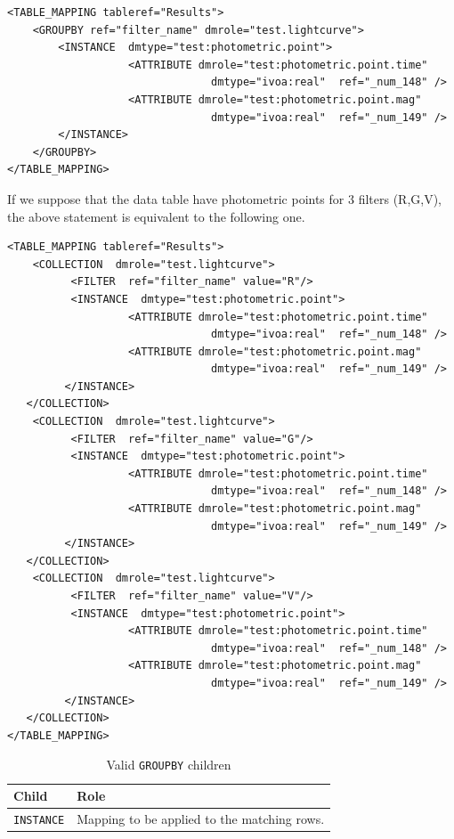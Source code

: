 \documentclass[11pt,a4paper]{ivoa}
\begin{document}
\begin{lstlisting}[caption={GROUPBY examples},style=XML]
<TABLE_MAPPING tableref="Results">
    <GROUPBY ref="filter_name" dmrole="test.lightcurve">
        <INSTANCE  dmtype="test:photometric.point">
                   <ATTRIBUTE dmrole="test:photometric.point.time" 
                                dmtype="ivoa:real"  ref="_num_148" />
                   <ATTRIBUTE dmrole="test:photometric.point.mag" 
                                dmtype="ivoa:real"  ref="_num_149" />
        </INSTANCE>
    </GROUPBY>
</TABLE_MAPPING>
\end{lstlisting}

If we suppose that the data table have photometric points for 3 filters (R,G,V), the above statement is equivalent to the following one.

\begin{lstlisting}[caption={GROUPBY examples},style=XML]
<TABLE_MAPPING tableref="Results">
    <COLLECTION  dmrole="test.lightcurve">
          <FILTER  ref="filter_name" value="R"/>
          <INSTANCE  dmtype="test:photometric.point">
                   <ATTRIBUTE dmrole="test:photometric.point.time" 
                                dmtype="ivoa:real"  ref="_num_148" />
                   <ATTRIBUTE dmrole="test:photometric.point.mag" 
                                dmtype="ivoa:real"  ref="_num_149" />
         </INSTANCE>
   </COLLECTION>
    <COLLECTION  dmrole="test.lightcurve">
          <FILTER  ref="filter_name" value="G"/>
          <INSTANCE  dmtype="test:photometric.point">
                   <ATTRIBUTE dmrole="test:photometric.point.time" 
                                dmtype="ivoa:real"  ref="_num_148" />
                   <ATTRIBUTE dmrole="test:photometric.point.mag" 
                                dmtype="ivoa:real"  ref="_num_149" />
         </INSTANCE>
   </COLLECTION>
    <COLLECTION  dmrole="test.lightcurve">
          <FILTER  ref="filter_name" value="V"/>
          <INSTANCE  dmtype="test:photometric.point">
                   <ATTRIBUTE dmrole="test:photometric.point.time" 
                                dmtype="ivoa:real"  ref="_num_148" />
                   <ATTRIBUTE dmrole="test:photometric.point.mag" 
                                dmtype="ivoa:real"  ref="_num_149" />
         </INSTANCE>
   </COLLECTION>
</TABLE_MAPPING>
\end{lstlisting}



\begin{table}[hbtp]
\small
\centering
\begin{tabulary}{\linewidth}{|L|J|}
\hline
    \textbf{Child} &
    \textbf{Role} \\
\hline \hline
     \texttt{INSTANCE}    &
     Mapping to be applied to the matching rows.  \\       
\hline
\end{tabulary}
     \caption{Valid  \texttt{GROUPBY} children} 
     \label{tbl:group-children}
\end{table}
\end{document}
